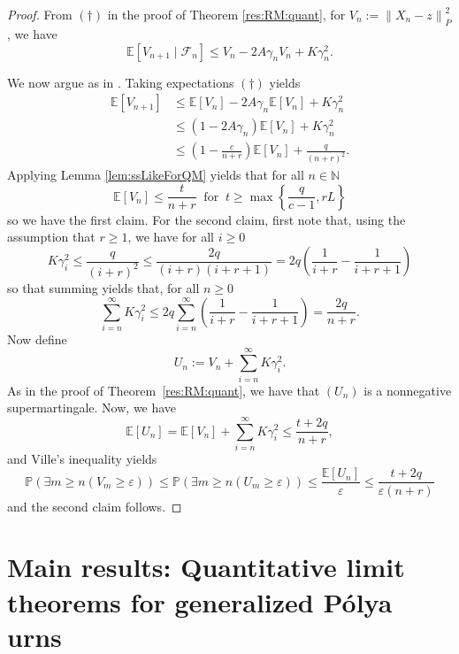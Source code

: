 \documentclass[12pt]{amsart}
\theoremstyle{definition}
\theoremstyle{remark}
\newcommand{\norm}[1]{\left\lVert#1\right\rVert}
\newcommand{\NN}{\mathbb{N}}
\newcommand{\PP}{\mathbb{P}}
\newcommand{\EE}{\mathbb{E}}
\begin{document}
\begin{proof}
 From $(\dagger)$ in the proof of Theorem \ref{res:RM:quant}, for $V_n:=\norm{X_n-z}_P^2$, we have
       \[
     \EE[V_{n+1}\mid \mathcal{F}_n] \le V_n -2A\gamma_{n}V_n 
     +K\gamma_n^2.
    \]

We now argue as in \cite[Theorem 3.6]{NeriPischkePowell:fejer:rates}. Taking expectations $(\dagger)$ yields
\begin{align*}
\EE[V_{n+1}]&\leq \EE[V_n]-2A\gamma_{n}\EE[V_n]+K\gamma_n^2\\
&\leq (1-2A\gamma_{n})\EE[V_n]+K\gamma_n^2\\
&\leq \left(1-\frac{c}{n+r}\right)\EE[V_n]+\frac{q}{(n+r)^2}.
\end{align*}
Applying Lemma \ref{lem:ssLikeForQM} yields that for all $n\in\NN$
\[
\EE[V_n]\leq \frac{t}{n+r} \ \text{ for }\ t\geq \max\left\{\frac{q}{c-1},rL\right\} 
\]
so we have the first claim. For the second claim, first note that, using the assumption that $r \ge 1$, we have for all $i\ge 0$
\[
K\gamma_i^2\le\frac{q}{(i+r)^2}\leq \frac{2q}{(i+r)(i+r+1)}=2q\left(\frac{1}{i+r}-\frac{1}{i+r+1}\right)
\]
so that summing yields that, for all $n \ge 0$
\[
\sum_{i=n}^\infty K\gamma_i^2\leq 2q\sum_{i=n}^\infty\left(\frac{1}{i+r}-\frac{1}{i+r+1}\right)=\frac{2q}{n+r}.
\]
Now define 
\[
U_{n}:=V_n+\sum_{i=n}^\infty K\gamma_i^2.
\]
As in the proof of Theorem~\ref{res:RM:quant}, we have that $(U_{n})$ is a nonnegative supermartingale. Now, we have
\[
\EE[U_n]=\EE[V_n]+\sum_{i=n}^\infty K\gamma_i^2\leq \frac{t+2q}{n+r},
\]
and Ville's inequality yields
\[
\PP\left(\exists m\geq n(V_m\geq \varepsilon)\right)\leq \PP\left(\exists m\geq n(U_m\geq \varepsilon)\right)\leq \frac{\EE[U_n]}{\varepsilon}\leq \frac{t+2q}{\varepsilon(n+r)}
\]
and the second claim follows.
\end{proof}




\section{Main results: Quantitative limit theorems for generalized P\'olya urns }
\label{subsec:urns}
\end{document}
